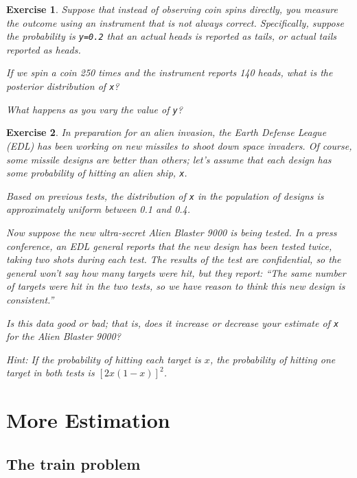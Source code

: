 \documentclass[12pt]{book}
\theoremstyle{exercise}
\newtheorem{exercise}{Exercise}[chapter]
\newcommand{\py}[1]{{\tt #1}}%
\begin{document}
\begin{exercise}
Suppose that instead of observing coin spins directly, you measure the outcome using an instrument that is not always correct.  Specifically, suppose the probability is \py{y=0.2} that an actual heads is reported
as tails, or actual tails reported as heads.

If we spin a coin 250 times and the instrument reports 140 heads, what is the posterior distribution of \py{x}?

What happens as you vary the value of \py{y}?
\end{exercise}


\begin{exercise}
In preparation for an alien invasion, the Earth Defense League (EDL) has been working on new missiles to shoot down space invaders.  Of course, some missile designs are better than others; let's assume that each design has some probability of hitting an alien ship, \py{x}.

Based on previous tests, the distribution of \py{x} in the population of designs is approximately uniform between 0.1 and 0.4.

Now suppose the new ultra-secret Alien Blaster 9000 is being tested.  In a press conference, an EDL general reports that the new design has been tested twice, taking two shots during each test.  The results of the test are confidential, so the general won't say how many targets were hit, but they report: ``The same number of targets were hit in the two tests, so we have reason to think this new design is consistent.''

Is this data good or bad; that is, does it increase or decrease your estimate of \py{x} for the Alien Blaster 9000?

Hint: If the probability of hitting each target is $x$, the probability of hitting one target in both tests is $[2x(1-x)]^2$.
\end{exercise}


\chapter{More Estimation}
\label{estimation}

\section{The train problem}

\end{document}
